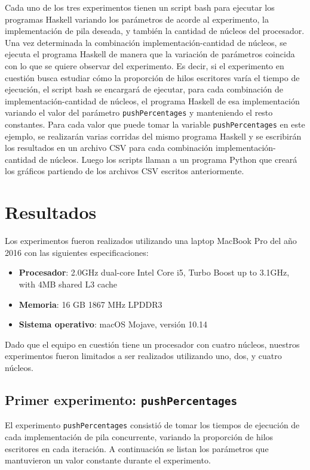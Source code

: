 
Cada uno de los tres experimentos tienen un script bash para ejecutar los programas Haskell variando los parámetros de acorde al experimento, la implementación de pila deseada, y también la cantidad de núcleos del procesador.
Una vez determinada la combinación implementación-cantidad de núcleos, se ejecuta el programa Haskell de manera que la variación de parámetros coincida con lo que se quiere observar del experimento.
Es decir, si el experimento en cuestión busca estudiar cómo la proporción de hilos escritores varía el tiempo de ejecución, el script bash se encargará de ejecutar, para cada combinación de implementación-cantidad de núcleos, el programa Haskell de esa implementación variando el valor del parámetro \texttt{pushPercentages} y manteniendo el resto constantes.
Para cada valor que puede tomar la variable \texttt{pushPercentages} en este ejemplo, se realizarán varias corridas del mismo programa Haskell y se escribirán los resultados en un archivo CSV para cada combinación implementación-cantidad de núcleos.
Luego los scripts llaman a un programa Python que creará los gráficos partiendo de los archivos CSV escritos anteriormente.

\section{Resultados}\label{sec:results}

Los experimentos fueron realizados utilizando una laptop MacBook Pro del año 2016 con las siguientes especificaciones:

\begin{itemize}
    \item \textbf{Procesador}: 2.0GHz dual-core Intel Core i5, Turbo Boost up to 3.1GHz, with 4MB shared L3 cache
    \item \textbf{Memoria}: 16 GB 1867 MHz LPDDR3
    \item \textbf{Sistema operativo}: macOS Mojave, versión 10.14
\end{itemize}

Dado que el equipo en cuestión tiene un procesador con cuatro núcleos, nuestros experimentos fueron limitados a ser realizados utilizando uno, dos, y cuatro núcleos.

\subsection{Primer experimento: \texttt{pushPercentages}}\label{subsec:pushPercentages}
El experimento \texttt{pushPercentages} consistió de tomar los tiempos de ejecución de cada implementación de pila concurrente, variando la proporción de hilos escritores en cada iteración.
A continuación se listan los parámetros que mantuvieron un valor constante durante el experimento.

